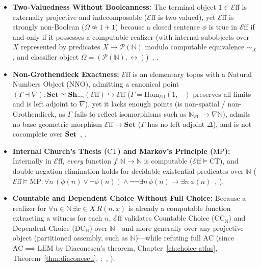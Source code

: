 \documentclass[10pt,twoside,openright]{book}
\theoremstyle{crmplain}
\theoremstyle{crmdef}
\theoremstyle{crmremark}
\newcommand{\Eff}{\mathcal{E}\mathrm{ff}}
\begin{document}
\begin{itemize}[leftmargin=1.5em]

  \item \textbf{Two-Valuedness Without Booleanness:} The terminal object $1 \in \Eff$ is externally projective and indecomposable ($\Eff$ is two-valued), yet $\Eff$ is strongly non-Boolean ($\Omega \not\simeq 1+1$) because a closed sentence $\phi$ is true in $\Eff$ if and only if it possesses a computable realizer (with internal subobjects over $X$ represented by predicates $X \to \mathcal{P}(\mathbb{N})$ modulo computable equivalence $\sim_X$, and classifier object $\Omega = (\mathcal{P}(\mathbb{N}), {\leftrightarrow})$)~\cite{Hyland82}, \cite[\S 3.1]{vanOosten08}.

  \item \textbf{Non-Grothendieck Exactness:} $\Eff$ is an elementary topos with a Natural Numbers Object ($\mathrm{NNO}$), admitting a canonical point $(\Gamma \dashv \nabla) : \mathbf{Set} \simeq \mathbf{Sh}_{\neg\neg}(\Eff) \hookrightarrow \Eff$ ($\Gamma = \mathrm{Hom}_{\Eff}(1, -)$ preserves all limits and is left adjoint to $\nabla$), yet it lacks enough points (is non-spatial / non-Grothendieck, as $\Gamma$ fails to reflect isomorphisms such as $\mathbb{N}_{\Eff} \to \nabla\mathbb{N}$), admits no base geometric morphism $\Eff \to \mathbf{Set}$ ($\Gamma$ has no left adjoint $\Delta$), and is not cocomplete over $\mathbf{Set}$~\cite{Hyland82}, \cite[\S\S 3.1--3.2]{vanOosten08}.

  \item \textbf{Internal Church's Thesis ($\mathrm{CT}$) and Markov's Principle ($\mathrm{MP}$):} Internally in $\Eff$, \emph{every} function $f: \mathbb{N} \to \mathbb{N}$ is computable ($\Eff \models \mathrm{CT}$), and double-negation elimination holds for decidable existential predicates over $\mathbb{N}$ ($\Eff \models \mathrm{MP}: \forall n\,(\phi(n) \vee \neg\phi(n)) \wedge \neg\neg\exists n\,\phi(n) \to \exists n\,\phi(n)$~\cite{Hyland82}, \cite[\S 3.2]{vanOosten08}).

  \item \textbf{Countable and Dependent Choice Without Full Choice:} Because a realizer for $\forall n \in \mathbb{N}\,\exists x \in X\, R(n, x)$ is already a computable function extracting a witness for each $n$, $\Eff$ validates Countable Choice ($\mathrm{CC}_{\mathbb{N}}$) and Dependent Choice ($\mathrm{DC}_{\mathbb{N}}$) over $\mathbb{N}$---and more generally over any projective object (partitioned assembly, such as $\mathbb{N}$)---while refuting full $\mathrm{AC}$ (since $\mathrm{AC} \implies \mathrm{LEM}$ by Diaconescu's theorem, Chapter~\ref{ch:choice-atlas}, Theorem~\ref{thm:diaconescu}, \cite{Diaconescu75};~\cite{Hyland82}, \cite[\S 3.2]{vanOosten08}).

\end{itemize}
\end{document}
